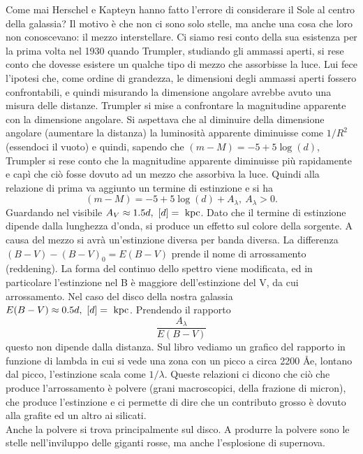Come mai Herschel e Kapteyn hanno fatto l'errore di considerare il Sole al centro della galassia? Il motivo è che non ci sono solo stelle, ma anche una cosa che loro non conoscevano: il mezzo interstellare. Ci siamo resi conto della sua esistenza per la prima volta nel 1930 quando Trumpler, studiando gli ammassi aperti, si rese conto che dovesse esistere un qualche tipo di mezzo che assorbisse la luce. Lui fece l'ipotesi che, come ordine di grandezza, le dimensioni degli ammassi aperti fossero confrontabili, e quindi misurando la dimensione angolare avrebbe avuto una misura delle distanze. Trumpler si mise a confrontare la magnitudine apparente con la dimensione angolare. Si aspettava che al diminuire della dimensione angolare (aumentare la distanza) la luminosità apparente diminuisse come $1/R^2$ (essendoci il vuoto) e quindi, sapendo che $(m-M)=-5+5\log(d)$, Trumpler si rese conto che la magnitudine apparente diminuisse più rapidamente e capì che ciò fosse dovuto ad un mezzo che assorbiva la luce. Quindi alla relazione di prima va aggiunto un termine di estinzione e si ha 
\[
    (m-M)=-5+5\log(d)+A_{\lambda}, \ A_{\lambda}>0.
\]
Guardando nel visibile $A_V \approx 1.5 d,\ [d]=\um{kpc}$. Dato che il termine di estinzione dipende dalla lunghezza d'onda, si produce un effetto sul colore della sorgente. A causa del mezzo si avrà un'estinzione diversa per banda diversa. La differenza $(B-V)-(B-V)_0=E(B-V)$ prende il nome di arrossamento (reddening). La forma del continuo dello spettro viene modificata, ed in particolare l'estinzione nel B è maggiore dell'estinzione del V, da cui arrossamento. Nel caso del disco della nostra galassia $E(B-V)\approx 0.5 d,\ [d]=\um{kpc}$. Prendendo il rapporto
\[
\frac{A_\lambda}{E(B-V)}
\]
questo non dipende dalla distanza. Sul libro vediamo un grafico del rapporto in funzione di lambda in cui si vede una zona con un picco a circa 2200 \AA e, lontano dal picco, l'estinzione scala come $1/\lambda$. Queste relazioni ci dicono che ciò che produce l'arrossamento è polvere (grani macroscopici, della frazione di micron), che produce l'estinzione e ci permette di dire che un contributo grosso è dovuto alla grafite ed un altro ai silicati.\\
Anche la polvere si trova principalmente sul disco. A produrre la polvere sono le stelle nell'inviluppo delle giganti rosse, ma anche l'esplosione di supernova.\\
